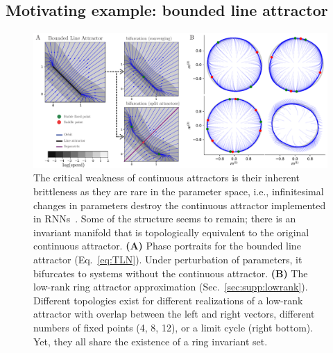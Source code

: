 \documentclass{article} %
\newcounter{ct}
\theoremstyle{definition}
\theoremstyle{remark}
\renewcommand{\cite}{\citep}
\begin{document}
\subsection{Motivating example: bounded line attractor}\label{sec:motivating:line}
\begin{figure}[tbhp]
  \centering
  \includegraphics[width=\textwidth]{lara_bifurcations_simple}
  \caption{The critical weakness of continuous attractors is their inherent brittleness as they are rare in the parameter space, i.e., infinitesimal changes in parameters destroy the continuous attractor implemented in RNNs~\cite{seung1996,Renart2003}.
  Some of the structure seems to remain; there is an invariant manifold that is topologically equivalent to the original continuous attractor.
    \textbf{(A)} Phase portraits for the bounded line attractor (Eq.~\eqref{eq:TLN}).
    Under perturbation of parameters, it bifurcates to systems without the continuous attractor.
    \textbf{(B)} The low-rank ring attractor approximation (Sec.~\eqref{sec:supp:lowrank}).
    Different topologies exist for different realizations of a low-rank attractor with overlap between the left and right vectors, different numbers of fixed points (4, 8, 12), or a limit cycle (right bottom).
    Yet, they all share the existence of a ring invariant set.
}\label{fig:lara_bifurcations}
\end{figure}

\end{document}
